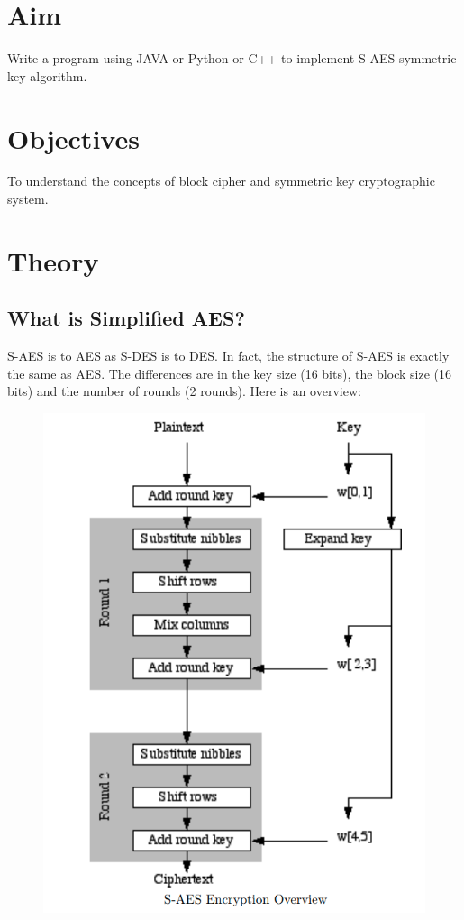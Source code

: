 \documentclass[11pt]{article}
\begin{document}
\tableofcontents
\thispagestyle{empty}
\clearpage

\setcounter{page}{1}

\section{Aim}
Write a program using JAVA or Python or C++ to implement S-AES symmetric key
algorithm.

\section{Objectives}
To understand the concepts of block cipher and symmetric key cryptographic
system.

\section{Theory}

\subsection{What is Simplified AES?}
S-AES is to AES as S-DES is to DES. In fact, the structure of S-AES is exactly the
same as AES. The differences are in the key size (16 bits), the block size (16 bits) and the number
of rounds (2 rounds). Here is an overview:

\begin{figure}[H]
	\centering
	\includegraphics[scale=0.5]{saes.png}
	\caption{}
\end{figure}
\end{document}

